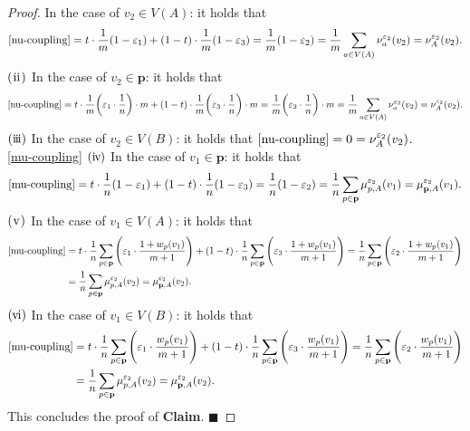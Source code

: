 \documentclass{article}
\numberwithin{equation}{section}
\theoremstyle{definition}
\newcommand{\eps}{\varepsilon} %
\begin{document}
\begin{proof}
In the case of $v_2\in V(A)$: it holds that
\begin{align*}
    \eqref{nu-coupling} = t\cdot\frac{1}{m}(1-\eps_1) + (1-t)\cdot\frac{1}{m}(1-\eps_3)
    = \frac{1}{m}(1-\eps_2) = \frac{1}{m}\sum_{a\in V(A)}\nu_a^{\eps_2}(v_2) = \nu_A^{\eps_2}(v_2).
\end{align*}
$\rm(\hspace{.08em}ii\hspace{.08em})$ 
In the case of $v_2\in \mathbf{p}$: it holds that
\begin{align*}
    \eqref{nu-coupling} 
    = t\cdot\frac{1}{m}\bigg(\eps_1\cdot\frac{1}{n}\bigg)\cdot m + (1-t)\cdot\frac{1}{m}\bigg(\eps_3\cdot\frac{1}{n}\bigg)\cdot m
    = \frac{1}{m}\bigg(\eps_2\cdot\frac{1}{n}\bigg)\cdot m = \frac{1}{m}\sum_{a\in V(A)}\nu_a^{\eps_2}(v_2) = \nu_A^{\eps_2}(v_2).
\end{align*}
$\rm(i\hspace{-.08em}i\hspace{-.08em}i)$ 
In the case of $v_2\in V(B)$: it holds that $\eqref{nu-coupling} = 0 = \nu_A^{\eps_2}(v_2)$. \vspace{1mm} \\
\underline{\eqref{mu-coupling}}
$\rm(i\hspace{-.08em}v\hspace{-.06em})$ 
In the case of $v_1\in \mathbf{p}$: it holds that
\begin{align*}
    \eqref{mu-coupling} = t\cdot\frac{1}{n}(1-\eps_1) + (1-t)\cdot\frac{1}{n}(1-\eps_3)
    = \frac{1}{n}(1-\eps_2) = \frac{1}{n}\sum_{p\in \mathbf{p}}\mu_{p,A}^{\eps_2}(v_1) = \mu_{\mathbf{p},A}^{\eps_2}(v_1).
\end{align*}
$\rm(\hspace{.06em}v\hspace{.06em})$ 
In the case of $v_1\in V(A)$: it holds that
\begin{align*}
    \eqref{mu-coupling} 
    &= t\cdot\frac{1}{n}\sum_{p\in\mathbf{p}}\Bigg(\eps_1\cdot\frac{1+w_p(v_1)}{m+1}\Bigg) + (1-t)\cdot\frac{1}{n}\sum_{p\in\mathbf{p}}\Bigg(\eps_3\cdot\frac{1+w_p(v_1)}{m+1}\Bigg)
    = \frac{1}{n}\sum_{p\in\mathbf{p}}\Bigg(\eps_2\cdot\frac{1+w_p(v_1)}{m+1}\Bigg) \\
    &= \frac{1}{n}\sum_{p\in\mathbf{p}}\mu_{p,A}^{\eps_2}(v_2) = \mu_{\mathbf{p},A}^{\eps_2}(v_2).
\end{align*}
$\rm(\hspace{-.06em}v\hspace{-.08em}i)$ 
In the case of $v_1\in V(B)$: it holds that 
\begin{align*}
    \eqref{mu-coupling} 
    &= t\cdot\frac{1}{n}\sum_{p\in\mathbf{p}}\Bigg(\eps_1\cdot\frac{w_p(v_1)}{m+1}\Bigg) + (1-t)\cdot\frac{1}{n}\sum_{p\in\mathbf{p}}\Bigg(\eps_3\cdot\frac{w_p(v_1)}{m+1}\Bigg)
    = \frac{1}{n}\sum_{p\in\mathbf{p}}\Bigg(\eps_2\cdot\frac{w_p(v_1)}{m+1}\Bigg) \\
    &= \frac{1}{n}\sum_{p\in\mathbf{p}}\mu_{p,A}^{\eps_2}(v_2) = \mu_{\mathbf{p},A}^{\eps_2}(v_2).
\end{align*}
This concludes the proof of \textbf{Claim}. $\blacksquare$


\end{proof}
\end{document}
